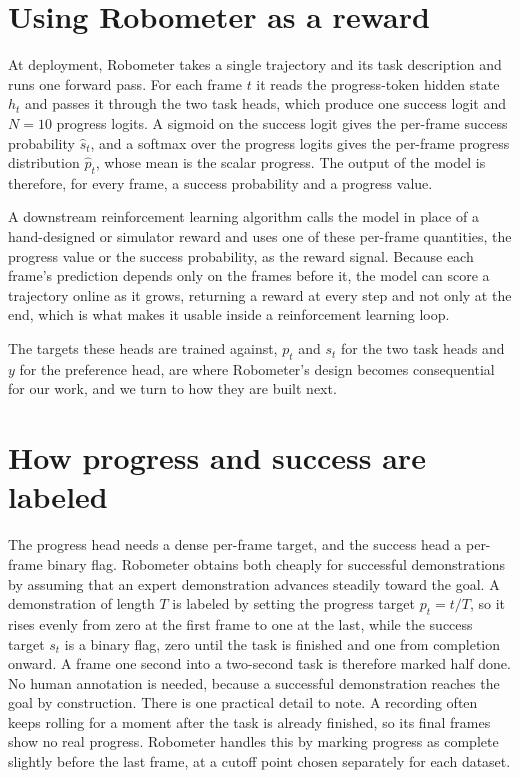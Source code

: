 \section{Using Robometer as a reward}

At deployment, Robometer takes a single trajectory and its task description and runs one forward pass. For each frame $t$ it reads the progress-token hidden state $h_t$ and passes it through the two task heads, which produce one success logit and $N = 10$ progress logits. A sigmoid on the success logit gives the per-frame success probability $\hat{s}_t$, and a softmax over the progress logits gives the per-frame progress distribution $\hat{p}_t$, whose mean is the scalar progress. The output of the model is therefore, for every frame, a success probability and a progress value.

A downstream reinforcement learning algorithm calls the model in place of a hand-designed or simulator reward and uses one of these per-frame quantities, the progress value or the success probability, as the reward signal. Because each frame's prediction depends only on the frames before it, the model can score a trajectory online as it grows, returning a reward at every step and not only at the end, which is what makes it usable inside a reinforcement learning loop.

The targets these heads are trained against, $p_t$ and $s_t$ for the two task heads and $y$ for the preference head, are where Robometer's design becomes consequential for our work, and we turn to how they are built next.

\section{How progress and success are labeled}

The progress head needs a dense per-frame target, and the success head a per-frame binary flag. Robometer obtains both cheaply for successful demonstrations by assuming that an expert demonstration advances steadily toward the goal. A demonstration of length $T$ is labeled by setting the progress target $p_t = t/T$, so it rises evenly from zero at the first frame to one at the last, while the success target $s_t$ is a binary flag, zero until the task is finished and one from completion onward. A frame one second into a two-second task is therefore marked half done. No human annotation is needed, because a successful demonstration reaches the goal by construction. There is one practical detail to note. A recording often keeps rolling for a moment after the task is already finished, so its final frames show no real progress. Robometer handles this by marking progress as complete slightly before the last frame, at a cutoff point chosen separately for each dataset.

